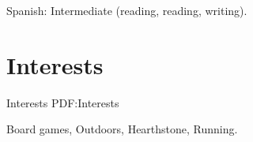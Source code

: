 \documentclass[letterpaper,10pt,oneside]{simpleresumecv}
\newcommand{\CVNote}{Resume compiled on {\today} for Apple}
\begin{document}
\begin{body}
\GapNoBreak%
\BulletItem%
Spanish: Intermediate (reading, reading, writing).


\section%
{Interests}
{Interests}
{PDF:Interests}

Board games,
Outdoors,
Hearthstone,
Running.

\end{body}


\label{LastPage}~%
\end{document}
